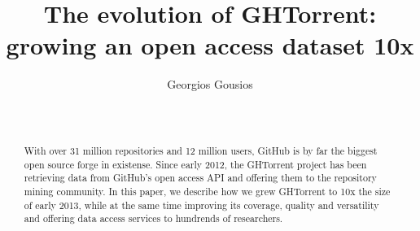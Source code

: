 \documentclass{sig-alternate}
\begin{document}






%

\title{The evolution of GHTorrent: growing an open access dataset 10x}
%
\author{
%
\alignauthor Georgios Gousios\\
       \\
       \\
}

\maketitle
\begin{abstract}

With over 31 million repositories and 12 million users, GitHub is by far the
biggest open source forge in existense. Since early 2012, the GHTorrent project
has been retrieving data from GitHub's open access API and offering them to the
repository mining community.  In this paper, we describe how we grew GHTorrent
to 10x the size of early 2013, while at the same time improving its coverage,
quality and versatility and offering data access services to hundrends of
researchers.

\end{abstract}
\end{document}
